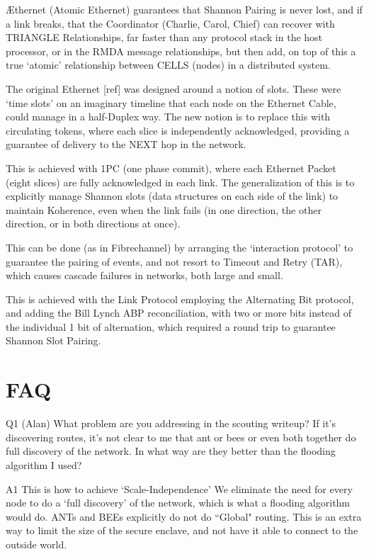 \documentclass[../../../OAE-SPEC-MAIN.tex]{subfiles}
\begin{document}
Æthernet (Atomic Ethernet) guarantees that Shannon Pairing is never lost, and if a link breaks, that the Coordinator (Charlie, Carol, Chief) can recover with TRIANGLE Relationships, far faster than any protocol stack in the host processor, or in the RMDA message relationships, but then add, on top of this a true `atomic' relationship between CELLS (nodes) in a distributed system.

The original Ethernet [ref] was designed around a notion of slots. These were `time slots' on an imaginary timeline that each node on the Ethernet Cable, could manage in a half-Duplex way.  The new notion is to replace this with circulating tokens, where each slice is independently acknowledged, providing a guarantee of delivery to the NEXT hop in the network.

This is achieved with 1PC (one phase commit), where each Ethernet Packet (eight slices) are fully acknowledged in each link. The generalization of this is to explicitly manage Shannon slots (data structures on each side of the link) to maintain Koherence, even when the link fails (in one direction, the other direction, or in both directions at once).

This can be done (as in Fibrechannel)  by arranging the `interaction protocol' to guarantee the pairing of events, and not resort to Timeout and Retry (TAR), which causes cascade failures in networks, both large and small.

This is achieved with the Link Protocol employing the Alternating Bit protocol, and adding the Bill Lynch ABP reconciliation, with two or more bits instead of the individual 1 bit of alternation, which required a round trip to guarantee Shannon Slot Pairing.


\section{FAQ}

Q1 (Alan) What problem are you addressing in the scouting writeup?  If it’s discovering routes, it’s not clear to me that ant or bees or even both together do full discovery of the network.  In what way are they better than the flooding algorithm I used?

A1 This is how to achieve `Scale-Independence' We eliminate the need for   every node  to do a `full discovery' of the network, which is what a flooding algorithm would do.  ANTs and BEEs explicitly do not do ``Global" routing. This is an extra way to limit the size of the secure enclave, and not have it able to connect to the outside world.  
\end{document}
